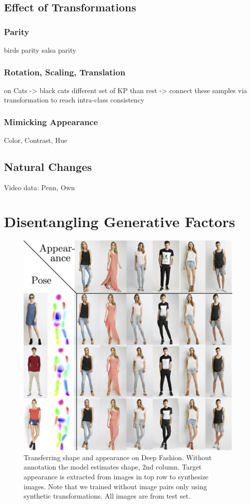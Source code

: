 	\subsection{Effect of Transformations}
		\subsubsection{Parity}
		birds parity
		salsa parity
		\subsubsection{Rotation, Scaling, Translation}
			on Cats -> black cats different set of KP than rest -> connect these samples via transformation to reach intra-class consistency
		\subsubsection{Mimicking Appearance}
		Color, Contrast, Hue
		\subsection{Natural Changes}
		Video data: Penn, Own
\section{Disentangling Generative Factors}

	\begin{figure}[t]
		\centering
		\includegraphics[trim={0cm 0cm 0cm 0cm},clip, width=.7\linewidth]{fig/swappy}
		\caption{Transferring shape and appearance on Deep Fashion. Without annotation the model estimates shape, 2nd column. Target appearance is extracted from images in top row to synthesize images. Note that we trained without image pairs only using synthetic transformations.
		All images are from test set.}
		\label{fig:allswaps}
	\end{figure}

